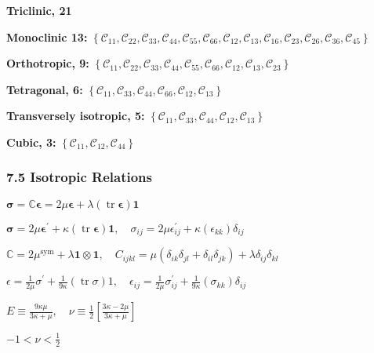\textbf{Triclinic, 21}

\textbf{Monoclinic 13:}
\(\left\{\mathcal{C}_{11}, \mathcal{C}_{22}, \mathcal{C}_{33}, \mathcal{C}_{44}, \mathcal{C}_{55}, \mathcal{C}_{66}, \mathcal{C}_{12}, \mathcal{C}_{13}, \mathcal{C}_{16}, \mathcal{C}_{23}, \mathcal{C}_{26}, \mathcal{C}_{36}, \mathcal{C}_{45}\right\}\)

\textbf{Orthotropic, 9:}
\(\left\{\mathcal{C}_{11}, \mathcal{C}_{22}, \mathcal{C}_{33}, \mathcal{C}_{44}, \mathcal{C}_{55}, \mathcal{C}_{66}, \mathcal{C}_{12}, \mathcal{C}_{13}, \mathcal{C}_{23}\right\}\)

\textbf{Tetragonal, 6:}
\(\left\{\mathcal{C}_{11}, \mathcal{C}_{33}, \mathcal{C}_{44}, \mathcal{C}_{66}, \mathcal{C}_{12}, \mathcal{C}_{13}\right\}\)

\textbf{Transversely isotropic, 5:}
\(\left\{\mathcal{C}_{11}, \mathcal{C}_{33}, \mathcal{C}_{44}, \mathcal{C}_{12}, \mathcal{C}_{13}\right\}\)

\textbf{Cubic, 3:}
\(\left\{\mathcal{C}_{11}, \mathcal{C}_{12}, \mathcal{C}_{44}\right\}\)

\hypertarget{isotropic-relations}{%
\subsubsection{7.5 Isotropic Relations}\label{isotropic-relations}}

\(\boldsymbol{\sigma}=\mathbb{C} \boldsymbol{\epsilon}=2 \mu \boldsymbol{\epsilon}+\lambda(\operatorname{tr} \boldsymbol{\epsilon}) \mathbf{1}\)

\(\boldsymbol{\sigma}=2 \mu \boldsymbol{\epsilon}^{\prime}+\kappa(\operatorname{tr} \boldsymbol{\epsilon}) \mathbf{1}, \quad \sigma_{i j}=2 \mu \epsilon_{i j}^{\prime}+\kappa\left(\epsilon_{k k}\right) \delta_{i j}\)

\(\mathbb{C}=2 \mu^{\mathrm{sym}}+\lambda \mathbf{1} \otimes \mathbf{1}, \quad C_{i j k l}=\mu\left(\delta_{i k} \delta_{j l}+\delta_{i l} \delta_{j k}\right)+\lambda \delta_{i j} \delta_{k l}\)

\(\epsilon=\frac{1}{2 \mu} \sigma^{\prime}+\frac{1}{9 \kappa}(\operatorname{tr} \sigma) 1, \quad \epsilon_{i j}=\frac{1}{2 \mu} \sigma_{i j}^{\prime}+\frac{1}{9 \kappa}\left(\sigma_{k k}\right) \delta_{i j}\)

\(E \equiv \frac{9 \kappa \mu}{3 \kappa+\mu}, \quad \nu \equiv \frac{1}{2}\left[\frac{3 \kappa-2 \mu}{3 \kappa+\mu}\right]\)

\(-1<\nu<\frac{1}{2}\)

